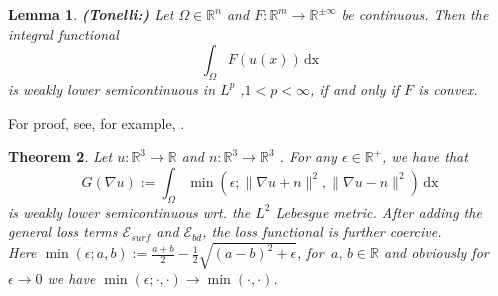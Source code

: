 \documentclass[draft,12pt,openany]{book}
\newcommand{\R}{\mathbb{R}}
\theoremstyle{plainnormal}
\newtheorem{theorem}{Theorem}[section]
\newtheorem{lemma}[theorem]{Lemma}
\theoremstyle{remark}
\begin{document}
\begin{lemma}\textbf{(Tonelli:)}
    Let $\Omega \in \R^n$ and $F:\R^m\rightarrow\R^{\pm\infty}$ be continuous. Then the integral functional $$\int_\Omega F(u(x))\,\mathrm{dx}$$
    is weakly lower semicontinuous in $L^p$ ,$1<p<\infty$, if and only if $F$ is convex.
\end{lemma}
For proof, see, for example, \cite{Dacorogna}.
\begin{theorem}\label{min_lsc}
    Let $u:\R^3\rightarrow\R$ and $n: \R^3\rightarrow\R^3$ . For any $\epsilon \in \R^+$, we have that $$G(\nabla u) := \int_\Omega \min (\epsilon; \|\nabla u+ n\|^2,\|\nabla u - n\|^2)\,\mathrm{dx}$$ is weakly lower semicontinuous wrt.  the $L^2$ Lebesgue metric. After adding the general loss terms $\mathcal{E}_{surf}$ and $\mathcal{E}_{bd}$, the loss functional is further coercive.\\
    Here $\min(\epsilon;a,b) := \frac{a + b}{2} - \frac{1}{2}\sqrt{(a-b)^2 + \epsilon}$, for $\,a,\,b \in \R$ and obviously for $\epsilon  \rightarrow 0$ we have $\min(\epsilon; \cdot, \cdot) \rightarrow \min(\cdot, \cdot)$. 
\end{theorem}
\end{document}
